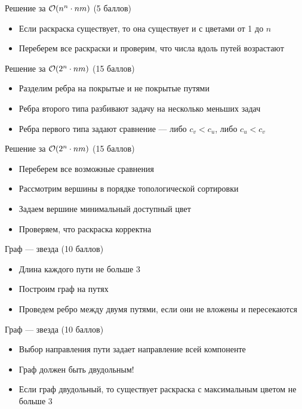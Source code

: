\begin{frame}{Решение за $\mathcal{O}(n^n \cdot nm)$ (5 баллов)}
  \begin{itemize}
  \item Если раскраска существует, то она существует и с цветами от 1 до $n$
  \item Переберем все раскраски и проверим, что числа вдоль путей возрастают
  \end{itemize}
\end{frame}
\begin{frame}{Решение за $\mathcal{O}(2^n \cdot nm)$ (15 баллов)}
  \begin{itemize}
  \item Разделим ребра на покрытые и не покрытые путями
  \item Ребра второго типа разбивают задачу на несколько меньших задач
  \item Ребра первого типа задают сравнение --- либо $c_v < c_u$, либо $c_u < c_v$
  \end{itemize}
\end{frame}
\begin{frame}{Решение за $\mathcal{O}(2^n \cdot nm)$ (15 баллов)}
  \begin{itemize}
  \item Переберем все возможные сравнения
  \item Рассмотрим вершины в порядке топологической сортировки
  \item Задаем вершине минимальный доступный цвет
  \item Проверяем, что раскраска корректна
  \end{itemize}
\end{frame}

\begin{frame}{Граф --- звезда (10 баллов)}
  \begin{itemize}
  \item Длина каждого пути не больше 3
  \item Построим граф на путях
  \item Проведем ребро между двумя путями, если они не вложены и пересекаются
  \end{itemize}
\end{frame}

\begin{frame}{Граф --- звезда (10 баллов)}
  \begin{itemize}
  \item Выбор направления пути задает направление всей компоненте
  \item Граф должен быть двудольным!
  \item Если граф двудольный, то существует раскраска с максимальным цветом не больше 3
  \end{itemize}
\end{frame}

